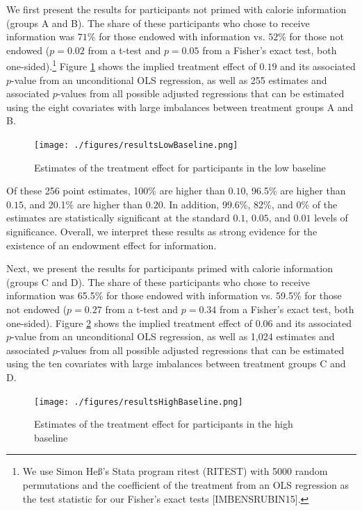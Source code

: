 \documentclass[12pt]{article}
\begin{document}
We first present the results for participants not primed with calorie information (groups A and B). The share of these participants who chose to receive information was $71\%$ for those endowed with information vs. $52\%$ for those not endowed ($p=0.02$ from a t-test and $p=0.05$ from a Fisher’s exact test,  both one-sided).\footnote{We use Simon Heß’s Stata program ritest (RITEST) with 5000 random permutations and the coefficient of the treatment from an OLS regression as the test statistic for our Fisher’s exact tests [IMBENSRUBIN15].} Figure \ref{fig:resultsLowBaseline} shows the implied treatment effect of $0.19$ and its associated $p$-value from an unconditional OLS regression, as well as 255 estimates and associated $p$-values from all possible adjusted regressions that can be estimated using the eight covariates with large imbalances between treatment groups A and B.

\begin{figure}[ht]
  \caption{Estimates of the treatment effect for participants in the low baseline}\label{fig:resultsLowBaseline}
  \begin{center}
  {\texttt{[image: ./figures/resultsLowBaseline.png]}}
  \end{center}
\end{figure}

Of these 256 point estimates, 100\% are higher than $0.10$, 96.5\% are higher than $0.15$, and 20.1\% are higher than $0.20$. In addition, 99.6\%, 82\%, and 0\% of the estimates are statistically significant at the standard $0.1$, $0.05$, and $0.01$ levels of significance. Overall, we interpret these results as strong evidence for the existence of an endowment effect for information.

Next, we present the results for participants primed with calorie information (groups C and D). The share of these participants who chose to receive information was 65.5\% for those endowed with information vs. 59.5\% for those not endowed ($p=0.27$ from a t-test and $p=0.34$ from a Fisher’s exact test, both one-sided). Figure \ref{fig:resultsHighBaseline} shows the implied treatment effect of $0.06$ and its associated $p$-value from an unconditional OLS regression, as well as 1,024 estimates and associated $p$-values from all possible adjusted regressions that can be estimated using the ten covariates with large imbalances between treatment groups C and D.

\begin{figure}[ht]
  \caption{Estimates of the treatment effect for participants in the high baseline}\label{fig:resultsHighBaseline}
  \begin{center}
  {\texttt{[image: ./figures/resultsHighBaseline.png]}}
  \end{center}
\end{figure}
\end{document}
